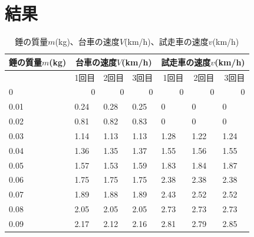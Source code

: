 \documentclass{jlreq}
\begin{document}
\section{結果}
\begin{table}[H]
  \centering
  \caption{錘の質量$m$(kg)、台車の速度$V$(km/h)、試走車の速度$v$(km/h)}
  \begin{tabular}{|l|lll|lll|}
  \hline
  \multicolumn{1}{|c|}{錘の質量$m$(kg)} & \multicolumn{3}{c|}{台車の速度$V$(km/h)} & \multicolumn{3}{c|}{試走車の速度$v$(km/h)} \\ \hline
   & \multicolumn{1}{r|}{1回目} & \multicolumn{1}{r|}{2回目} & \multicolumn{1}{r|}{3回目} & \multicolumn{1}{r|}{1回目} & \multicolumn{1}{r|}{2回目} & \multicolumn{1}{r|}{3回目} \\ \hline
  0 & \multicolumn{1}{r|}{0} & \multicolumn{1}{r|}{0} & \multicolumn{1}{r|}{0} & \multicolumn{1}{r|}{0} & \multicolumn{1}{r|}{0} & \multicolumn{1}{r|}{0} \\ \hline
  0.01 & \multicolumn{1}{l|}{0.24} & \multicolumn{1}{l|}{0.28} & 0.25 & \multicolumn{1}{l|}{0} & \multicolumn{1}{l|}{0} & 0 \\ \hline
  0.02 & \multicolumn{1}{l|}{0.81} & \multicolumn{1}{l|}{0.82} & 0.83 & \multicolumn{1}{l|}{0} & \multicolumn{1}{l|}{0} & 0 \\ \hline
  0.03 & \multicolumn{1}{l|}{1.14} & \multicolumn{1}{l|}{1.13} & 1.13 & \multicolumn{1}{l|}{1.28} & \multicolumn{1}{l|}{1.22} & 1.24 \\ \hline
  0.04 & \multicolumn{1}{l|}{1.36} & \multicolumn{1}{l|}{1.35} & 1.37 & \multicolumn{1}{l|}{1.55} & \multicolumn{1}{l|}{1.56} & 1.55 \\ \hline
  0.05 & \multicolumn{1}{l|}{1.57} & \multicolumn{1}{l|}{1.53} & 1.59 & \multicolumn{1}{l|}{1.83} & \multicolumn{1}{l|}{1.84} & 1.87 \\ \hline
  0.06 & \multicolumn{1}{l|}{1.75} & \multicolumn{1}{l|}{1.75} & 1.75 & \multicolumn{1}{l|}{2.38} & \multicolumn{1}{l|}{2.38} & 2.38 \\ \hline
  0.07 & \multicolumn{1}{l|}{1.89} & \multicolumn{1}{l|}{1.88} & 1.89 & \multicolumn{1}{l|}{2.43} & \multicolumn{1}{l|}{2.52} & 2.52 \\ \hline
  0.08 & \multicolumn{1}{l|}{2.05} & \multicolumn{1}{l|}{2.05} & 2.05 & \multicolumn{1}{l|}{2.73} & \multicolumn{1}{l|}{2.73} & 2.73 \\ \hline
  0.09 & \multicolumn{1}{l|}{2.17} & \multicolumn{1}{l|}{2.12} & 2.16 & \multicolumn{1}{l|}{2.81} & \multicolumn{1}{l|}{2.79} & 2.85 \\ \hline

\end{tabular}
\end{table}
\end{document}
